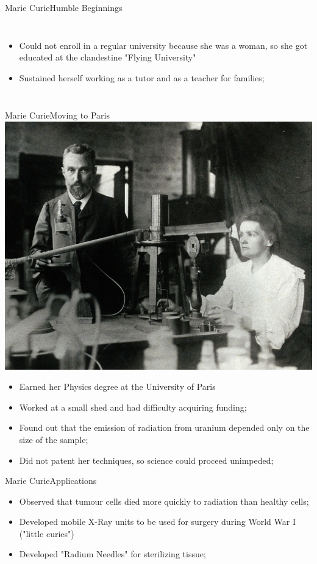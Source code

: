 \documentclass{beamer}
\begin{document}
\begin{CJK}{UTF8}{ipxm}
\begin{frame}{Marie Curie}{Humble Beginnings}
\begin{columns}
\begin{itemize}
    \item Could not enroll in a regular university because she was a woman, so she got educated at the clandestine "Flying University"
    \medskip

    \item Sustained herself working as a tutor and as a teacher for families;
  \end{itemize}
\end{columns}
\end{frame}

\begin{frame}{Marie Curie}{Moving to Paris}
  \hfill\includegraphics[width=.3\textwidth]{../img/marie_pierre_curie}
  \begin{itemize}
    \item Earned her Physics degree at the University of Paris

    \item Worked at a small shed and had difficulty acquiring funding;

    \item Found out that the emission of radiation from uranium
    depended only on the size of the sample;

    \item Did not patent her techniques, so science could proceed unimpeded;
  \end{itemize}
\end{frame}

\begin{frame}{Marie Curie}{Applications}
  \begin{itemize}
    \item Observed that tumour cells died more quickly to radiation than healthy cells;
    \medskip

    \item Developed mobile X-Ray units to be used for surgery during World War I ("little curies")
    \medskip

    \item Developed "Radium Needles" for sterilizing tissue;
    \medskip


\end{itemize}
\end{frame}
\end{CJK}
\end{document}
